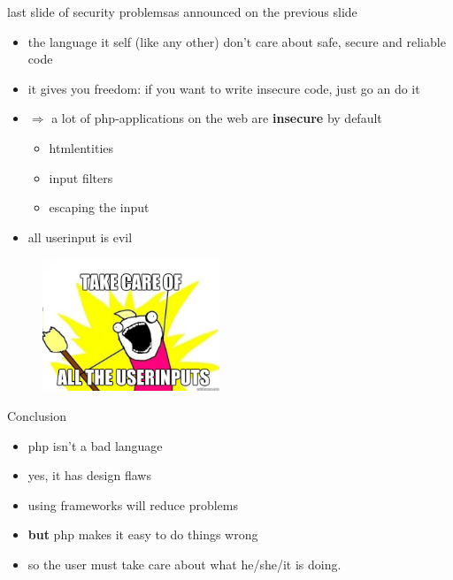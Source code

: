 \documentclass[final]{beamer}
\begin{document}
\begin{frame}{last slide of security problems}{as announced on the previous slide}
\begin{itemize}
\item the language it self (like any other) don't care about safe, secure and reliable code
\item it gives you freedom: if you want to write insecure code, just go an do it
\item $\Rightarrow$ a lot of php-applications on the web are \textbf{insecure} by default
	\begin{itemize}
		\item htmlentities
		\item input filters
		\item escaping the input
	\end{itemize}
\item \alert<2> { all userinput is evil }
\end{itemize}
\end{frame}

\begin{frame}
\begin{center}
\begin{figure}[ht]
  \centering
	\includegraphics[height=150px]{./../Graph/Meme/allthethings.jpg}
\end{figure}
\end{center}
\end{frame}



\begin{frame}{Conclusion}
\begin{itemize}
\item php isn't a bad language
\item yes, it has design flaws
\item using frameworks will reduce problems
\item \textbf{but} php makes it easy to do things wrong
\item so the user must take care about what he/she/it is doing.
\end{itemize}
\end{frame}
\end{document}
